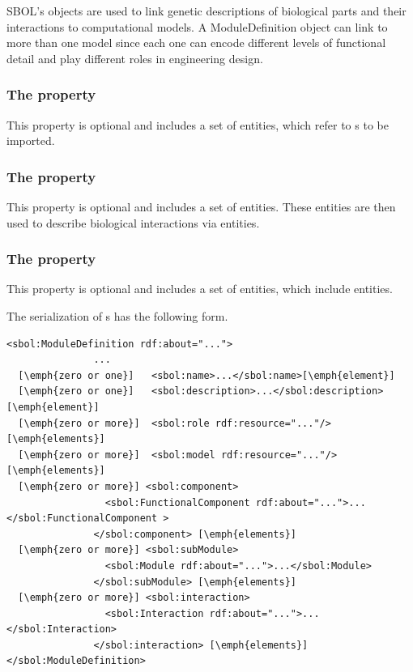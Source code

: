 SBOL's  objects are used to link genetic descriptions of biological parts and their interactions to computational models.
A ModuleDefinition object can link to more than one model since each one can encode different levels of functional detail and play different roles in engineering design. 


\subsubsection*{The  property}
This property is optional and includes a set of  entities, which refer to s to be imported.

\subsubsection*{The  property}
This property is optional and includes a set of  entities. These entities are then used to describe biological interactions via  entities.

\subsubsection*{The  property}
This property is optional and includes a set of  entities, which include  entities.

The serialization of s has the following form.
\begin{lstlisting}
<sbol:ModuleDefinition rdf:about="...">
               ...
  [\emph{zero or one}]   <sbol:name>...</sbol:name>[\emph{element}]
  [\emph{zero or one}]   <sbol:description>...</sbol:description>[\emph{element}]
  [\emph{zero or more}]  <sbol:role rdf:resource="..."/>[\emph{elements}]
  [\emph{zero or more}]  <sbol:model rdf:resource="..."/>[\emph{elements}]
  [\emph{zero or more}] <sbol:component>
                 <sbol:FunctionalComponent rdf:about="...">...</sbol:FunctionalComponent >
               </sbol:component> [\emph{elements}]
  [\emph{zero or more}] <sbol:subModule>
                 <sbol:Module rdf:about="...">...</sbol:Module>
               </sbol:subModule> [\emph{elements}]
  [\emph{zero or more}] <sbol:interaction>
                 <sbol:Interaction rdf:about="...">...</sbol:Interaction>
               </sbol:interaction> [\emph{elements}]
</sbol:ModuleDefinition>
\end{lstlisting}


